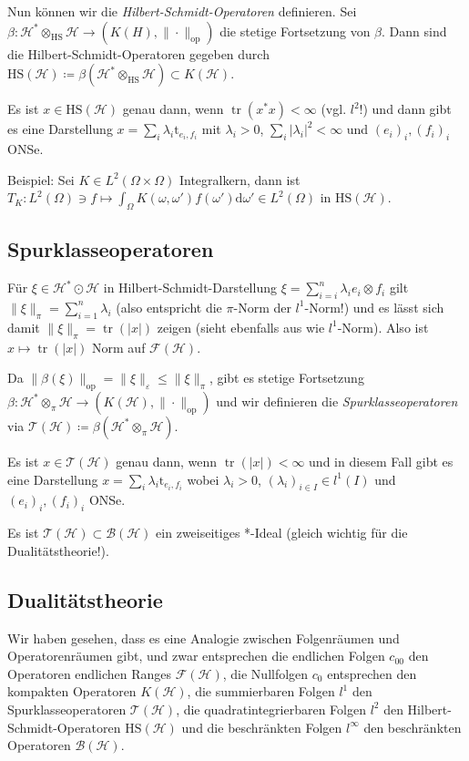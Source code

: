 \documentclass[11pt,a4paper]{scrartcl}
\newcommand{\Hc}{\mathcal{H}}
\newcommand{\B}{\mathcal{B}}
\newcommand{\F}{\mathcal{F}}
\newcommand{\T}{\mathcal{T}}
\theoremstyle{plain}
\theoremstyle{definition}
\theoremstyle{remark}
\DeclareMathOperator{\tr}{tr}
\begin{document}
Nun können wir die \emph{Hilbert-Schmidt-Operatoren} definieren. Sei $\beta: \Hc^*\otimes_\mathrm{HS} \Hc \to (K(H), \|\cdot\|_\mathrm{op})$ die stetige Fortsetzung von $\beta$. Dann sind die Hilbert-Schmidt-Operatoren gegeben durch $\mathrm{HS}(\Hc) \coloneqq \beta(\Hc^*\otimes_\mathrm{HS}\Hc) \subset K(\Hc)$. 

Es ist $x\in \mathrm{HS}(\Hc)$ genau dann, wenn $\tr(x^*x)<\infty$ (vgl. $l^2$!) und dann gibt es eine Darstellung $x=\sum_i \lambda_i \mathrm{t}_{e_i,f_i}$ mit $\lambda_i > 0$, $\sum_i |\lambda_i|^2 < \infty$ und $(e_i)_i, (f_i)_i$ ONSe.

Beispiel: Sei $K\in L^2(\Omega\times \Omega)$ Integralkern, dann ist $T_K: L^2(\Omega) \ni f \mapsto \int_\Omega K(\omega,\omega')f(\omega')\mathrm{d}\omega' \in L^2(\Omega)$ in $\mathrm{HS}(\Hc)$.

\subsection{Spurklasseoperatoren}

Für $\xi\in \Hc^*\odot \Hc$ in Hilbert-Schmidt-Darstellung $\xi=\sum_{i=i}^n \lambda_i e_i\otimes f_i$ gilt $\|\xi\|_\pi = \sum_{i=1}^n \lambda_i$ (also entspricht  die $\pi$-Norm der $l^1$-Norm!) und es lässt sich damit $\|\xi\|_\pi = \tr(|x|)$ zeigen (sieht ebenfalls aus wie $l^1$-Norm). Also ist $x\mapsto \tr(|x|)$ Norm auf $\F(\Hc)$.

Da $\|\beta(\xi)\|_\mathrm{op} = \|\xi\|_\varepsilon \leq \|\xi\|_\pi$, gibt es stetige Fortsetzung $\beta: \Hc^*\otimes_\pi \Hc \to (K(\Hc),\|\cdot\|_\mathrm{op})$ und wir definieren die \emph{Spurklasseoperatoren} via $\T(\Hc)\coloneqq \beta(\Hc^*\otimes_\pi \Hc)$.

Es ist $x\in \T(\Hc)$ genau dann, wenn $\tr(|x|)<\infty$ und in diesem Fall gibt es eine Darstellung $x=\sum_i \lambda_i \mathrm{t}_{e_i,f_i}$ wobei $\lambda_i > 0$, $(\lambda_i)_{i\in I}\in l^1(I)$ und $(e_i)_i, (f_i)_i$ ONSe.

Es ist $\T(\Hc)\subset \B(\Hc)$ ein zweiseitiges *-Ideal (gleich wichtig für die Dualitätstheorie!).  

\subsection{Dualitätstheorie}

Wir haben gesehen, dass es eine Analogie zwischen Folgenräumen und Operatorenräumen gibt, und zwar entsprechen die endlichen Folgen $c_{00}$ den Operatoren endlichen Ranges $\F(\Hc)$, die Nullfolgen $c_0$ entsprechen den kompakten Operatoren $K(\Hc)$, die summierbaren Folgen $l^1$ den Spurklasseoperatoren $\T(\Hc)$, die quadratintegrierbaren Folgen $l^2$ den Hilbert-Schmidt-Operatoren $\mathrm{HS}(\Hc)$ und die beschränkten Folgen $l^\infty$ den beschränkten Operatoren $\B(\Hc)$.
\end{document}
